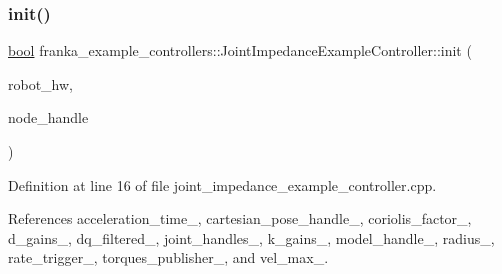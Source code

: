 \subsubsection{\texorpdfstring{init()}{init()}}
{\footnotesize\ttfamily \hyperlink{classbool}{bool} franka\+\_\+example\+\_\+controllers\+::\+Joint\+Impedance\+Example\+Controller\+::init (\begin{DoxyParamCaption}\item[{hardware\+\_\+interface\+::\+Robot\+HW $\ast$}]{robot\+\_\+hw,  }\item[{ros\+::\+Node\+Handle \&}]{node\+\_\+handle }\end{DoxyParamCaption})\hspace{0.3cm}{\ttfamily [override]}}



Definition at line 16 of file joint\+\_\+impedance\+\_\+example\+\_\+controller.\+cpp.



References acceleration\+\_\+time\+\_\+, cartesian\+\_\+pose\+\_\+handle\+\_\+, coriolis\+\_\+factor\+\_\+, d\+\_\+gains\+\_\+, dq\+\_\+filtered\+\_\+, joint\+\_\+handles\+\_\+, k\+\_\+gains\+\_\+, model\+\_\+handle\+\_\+, radius\+\_\+, rate\+\_\+trigger\+\_\+, torques\+\_\+publisher\+\_\+, and vel\+\_\+max\+\_\+.


